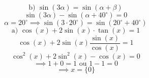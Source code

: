 \documentclass{article}
\begin{document}
\[ \text{b) } \sin(3\alpha) = \sin(\alpha + \beta) \]
\[ \sin(3\alpha) - \sin(\alpha + 40^\circ) = 0 \]
\[ \alpha = 20^\circ \implies \sin(3 \cdot 20^\circ) = \sin(20^\circ + 40^\circ) \]
\[ \text{a) } \cos(x) + 2\sin(x) \cdot \tan(x) = 1 \]
\[ \cos(x) + 2\sin(x) \frac{\sin(x)}{\cos(x)} = 1 \]
\[ \cos^2(x) + 2\sin^2(x) - \cos(x) = 0 \]
\[ \implies 1 + 0 = 1 \text{ ou } 1 - 1 = 0 \]
\[ \implies x = \{0 \} \]
\end{document}
